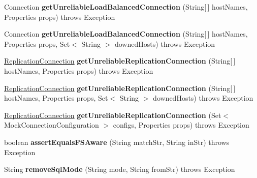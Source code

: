 \begin{DoxyCompactItemize}
Connection {\bfseries get\+Unreliable\+Load\+Balanced\+Connection} (String\mbox{[}$\,$\mbox{]} host\+Names, Properties props)  throws Exception 
\item 
\mbox{\label{classtestsuite_1_1_base_test_case_af1e7c3a34a87ab4a008843290942cdaa}} 
Connection {\bfseries get\+Unreliable\+Load\+Balanced\+Connection} (String\mbox{[}$\,$\mbox{]} host\+Names, Properties props, Set$<$ String $>$ downed\+Hosts)  throws Exception 
\item 
\mbox{\label{classtestsuite_1_1_base_test_case_ad87384bfe06e3ddfbf89578316b176a2}} 
\mbox{\hyperlink{interfacecom_1_1mysql_1_1cj_1_1jdbc_1_1ha_1_1_replication_connection}{Replication\+Connection}} {\bfseries get\+Unreliable\+Replication\+Connection} (String\mbox{[}$\,$\mbox{]} host\+Names, Properties props)  throws Exception 
\item 
\mbox{\label{classtestsuite_1_1_base_test_case_add2c34fed4dd457540016f9d22a6fcb2}} 
\mbox{\hyperlink{interfacecom_1_1mysql_1_1cj_1_1jdbc_1_1ha_1_1_replication_connection}{Replication\+Connection}} {\bfseries get\+Unreliable\+Replication\+Connection} (String\mbox{[}$\,$\mbox{]} host\+Names, Properties props, Set$<$ String $>$ downed\+Hosts)  throws Exception 
\item 
\mbox{\label{classtestsuite_1_1_base_test_case_a343014aac2808c32fbadb0f42a22f77d}} 
\mbox{\hyperlink{interfacecom_1_1mysql_1_1cj_1_1jdbc_1_1ha_1_1_replication_connection}{Replication\+Connection}} {\bfseries get\+Unreliable\+Replication\+Connection} (Set$<$ Mock\+Connection\+Configuration $>$ configs, Properties props)  throws Exception 
\item 
\mbox{\label{classtestsuite_1_1_base_test_case_a5c1fa014de36c1991223cb4b32cab1fc}} 
boolean {\bfseries assert\+Equals\+F\+S\+Aware} (String match\+Str, String in\+Str)  throws Exception 
\item 
\mbox{\label{classtestsuite_1_1_base_test_case_a9df2dad075d7a0d282a1c46a9be4bf66}} 
String {\bfseries remove\+Sql\+Mode} (String mode, String from\+Str)  throws Exception 
\end{DoxyCompactItemize}
